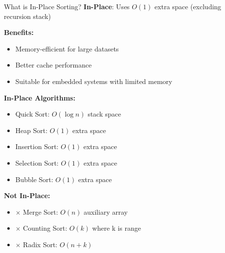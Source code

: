 \documentclass[aspectratio=169]{beamer}
\begin{document}
\begin{frame}{What is In-Place Sorting?}
  \textbf{In-Place}: Uses $O(1)$ extra space (excluding recursion stack)

  \vspace{0.3cm}
  \textbf{Benefits:}
  \begin{itemize}
    \item Memory-efficient for large datasets
    \item Better cache performance
    \item Suitable for embedded systems with limited memory
  \end{itemize}

  \vspace{0.3cm}
  \textbf{In-Place Algorithms:}
  \begin{itemize}
    \item \checkmark Quick Sort: $O(\log n)$ stack space
    \item \checkmark Heap Sort: $O(1)$ extra space
    \item \checkmark Insertion Sort: $O(1)$ extra space
    \item \checkmark Selection Sort: $O(1)$ extra space
    \item \checkmark Bubble Sort: $O(1)$ extra space
  \end{itemize}

  \vspace{0.3cm}
  \textbf{Not In-Place:}
  \begin{itemize}
    \item $\times$ Merge Sort: $O(n)$ auxiliary array
    \item $\times$ Counting Sort: $O(k)$ where k is range
    \item $\times$ Radix Sort: $O(n + k)$
  \end{itemize}
\end{frame}
\end{document}
